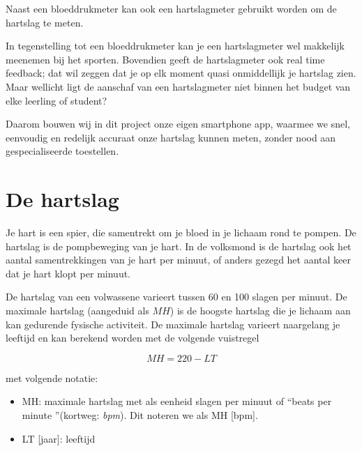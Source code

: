 Naast een bloeddrukmeter kan ook een hartslagmeter gebruikt worden om de hartslag te meten. 

\begin{minipage}{.5\linewidth}
\end{minipage} 
\begin{minipage}{.5\linewidth}
\end{minipage} 

In tegenstelling tot een bloeddrukmeter kan je een hartslagmeter wel makkelijk meenemen bij het sporten. Bovendien geeft de hartslagmeter ook real time feedback; dat wil zeggen dat je op elk moment quasi onmiddellijk je hartslag zien. Maar wellicht ligt de aanschaf van een hartslagmeter niet binnen het budget van elke leerling of student?

Daarom bouwen wij in dit project onze eigen smartphone app, waarmee we snel, eenvoudig en redelijk accuraat onze hartslag kunnen meten, zonder nood aan gespecialiseerde toestellen.


\section{De hartslag}
\label{sec:Mod1_Sec2}

Je hart is een spier, die samentrekt om je bloed in je lichaam rond te pompen. De hartslag is de pompbeweging van je hart. In de volksmond is de hartslag ook het aantal samentrekkingen van je hart per minuut, of anders gezegd het aantal keer dat je hart klopt per minuut.

De hartslag van een volwassene varieert tussen 60 en 100 slagen per minuut. De maximale hartslag (aangeduid als $MH$) is de hoogste hartslag die je lichaam aan kan gedurende fysische activiteit. De maximale hartslag varieert naargelang je leeftijd en kan berekend worden met de volgende vuistregel

\begin{equation*}
MH = 220-LT
\end{equation*}

met volgende notatie:
\begin{itemize}
	\item MH: maximale hartslag met als eenheid slagen per minuut of \textquotedblleft beats per minute \textquotedblright (kortweg: \emph{bpm}). 
	Dit noteren we als MH [bpm].
	\item LT [jaar]: leeftijd
\end{itemize}


